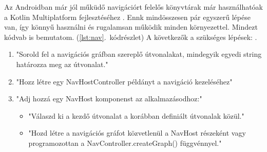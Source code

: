 Az Androidban már jól műküdő navigációrt felelős könyvtárak már használhatóak a Kotlin Multiplatform fejlesztéséhez \cite{NavigationKMP}.
Ennk mindösszesen pár egyszerű lépése van, így könnyű használni és rugalamsan működik minden környezettel.
Mindezt kódvab is bemutatom. (\ref{lst:nav}.~kódrészlet)
A következők a szükséges lépések: \cite{NavigationKMP}.
\begin{enumerate}
    \item "Sorold fel a navigációs gráfban szereplő útvonalakat, mindegyik egyedi string határozza meg az útvonalat."
    \item "Hozz létre egy NavHostController példányt a navigáció kezeléséhez"
    \item "Adj hozzá egy NavHost komponenst az alkalmazásodhoz:"
        \begin{itemize}
            \item "Válaszd ki a kezdő útvonalat a korábban definiált útvonalak közül."
            \item "Hozd létre a navigációs gráfot közvetlenül a NavHost részeként vagy programozottan a NavController.createGraph() függvénnyel."
        \end{itemize}
\end{enumerate}

